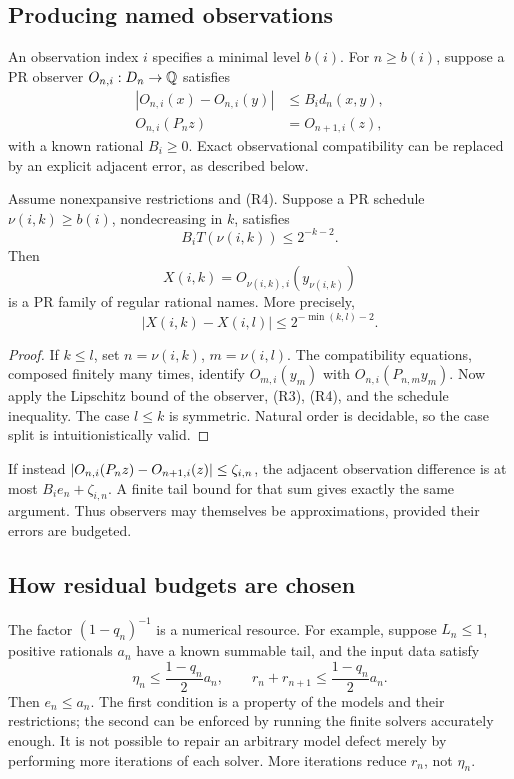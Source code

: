 \subsection{Producing named observations}

An observation index \(i\) specifies a minimal level \(b(i)\).
For \(n\ge b(i)\), suppose a PR observer \(O_{n,i}:D_n\to\mathbb Q\)
satisfies
\begin{align*}
 |O_{n,i}(x)-O_{n,i}(y)|&\le B_i d_n(x,y),\\
 O_{n,i}(P_nz)&=O_{n+1,i}(z),
\end{align*}
with a known rational \(B_i\ge0\). Exact observational
compatibility can be replaced by an explicit adjacent error, as
described below.

\begin{theorem}
\label{thm:tower-sampler}
Assume nonexpansive restrictions and (R4). Suppose a PR schedule
\(\nu(i,k)\ge b(i)\), nondecreasing in \(k\), satisfies
\[
 B_iT(\nu(i,k))\le2^{-k-2}.
\]
Then
\[
 X(i,k)=O_{\nu(i,k),i}(y_{\nu(i,k)})
\]
is a PR family of regular rational names. More precisely,
\[
 |X(i,k)-X(i,l)|\le2^{-\min(k,l)-2}.
 \label{eq:tower-name}\tag{R5}
\]
\end{theorem}
\begin{proof}
If \(k\le l\), set \(n=\nu(i,k)\), \(m=\nu(i,l)\).
The compatibility equations, composed finitely many times, identify
\(O_{m,i}(y_m)\) with \(O_{n,i}(P_{n,m}y_m)\). Now apply the
Lipschitz bound of the observer, (R3), (R4), and the schedule inequality.
The case \(l\le k\) is symmetric. Natural order is decidable, so
the case split is intuitionistically valid.
\end{proof}

If instead
\(\left|O_{n,i}(P_nz)-O_{n+1,i}(z)\right|\le\zeta_{i,n}\), the adjacent
observation difference is at most \(B_ie_n+\zeta_{i,n}\). A finite
tail bound for that sum gives exactly the same argument. Thus observers
may themselves be approximations, provided their errors are budgeted.

\subsection{How residual budgets are chosen}

The factor \((1-q_n)^{-1}\) is a numerical resource. For example,
suppose \(L_n\le1\), positive rationals \(a_n\) have a known
summable tail, and the input data satisfy
\[
 \eta_n\le\frac{1-q_n}{2}a_n,
 \qquad
 r_n+r_{n+1}\le\frac{1-q_n}{2}a_n.
\]
Then \(e_n\le a_n\). The first condition is a property of the
models and their restrictions; the second can be enforced by running
the finite solvers accurately enough. It is not possible to repair an
arbitrary model defect merely by performing more iterations of each
solver. More iterations reduce \(r_n\), not \(\eta_n\).

